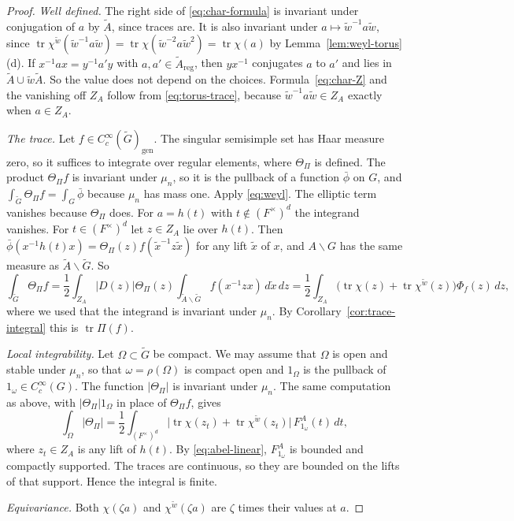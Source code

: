 \documentclass[12pt,letterpaper]{article}
\numberwithin{equation}{section}
\theoremstyle{plain}
\theoremstyle{definition}
\theoremstyle{remark}
\newcommand{\Gt}{\widetilde G}
\newcommand{\At}{\widetilde A}
\newcommand{\wt}{\tilde w}
\newcommand{\ZA}{Z_A}
\newcommand{\gen}{\mathrm{gen}}
\newcommand{\reg}{\mathrm{reg}}
\DeclareMathOperator{\tr}{tr}
\begin{document}
\begin{proof}
\emph{Well defined.} The right side of \eqref{eq:char-formula} is
invariant under conjugation of $a$ by $\At$, since traces are. It is
also invariant under $a\mapsto\wt^{-1}a\wt$, since
$\tr\chi^{\wt}(\wt^{-1}a\wt)=\tr\chi(\wt^{-2}a\wt^2)=\tr\chi(a)$ by
Lemma~\ref{lem:weyl-torus}(d). If $x^{-1}ax=y^{-1}a'y$ with
$a,a'\in\At_\reg$, then $yx^{-1}$ conjugates $a$ to $a'$ and lies in
$\At\cup\wt\At$. So the value does not depend on the choices.
Formula~\eqref{eq:char-Z} and the vanishing off $\ZA$ follow from
\eqref{eq:torus-trace}, because $\wt^{-1}a\wt\in\ZA$ exactly when
$a\in\ZA$.

\emph{The trace.} Let $f\in C_c^\infty(\Gt)_\gen$. The singular
semisimple set has Haar measure zero, so it suffices to integrate over
regular elements, where $\Theta_\Pi$ is defined. The product
$\Theta_\Pi f$ is invariant under $\mu_n$, so it is the pullback of a
function $\bar\phi$ on $G$, and $\int_{\Gt}\Theta_\Pi f=\int_G\bar\phi$
because $\mu_n$ has mass one. Apply \eqref{eq:weyl}. The elliptic term
vanishes because $\Theta_\Pi$ does. For $a=h(t)$ with
$t\notin(F^\times)^d$ the integrand vanishes. For $t\in(F^\times)^d$
let $z\in\ZA$ lie over $h(t)$. Then
$\bar\phi(x^{-1}h(t)x)=\Theta_\Pi(z)f(\tilde x^{-1}z\tilde x)$ for
any lift $\tilde x$ of $x$, and $A\backslash G$ has the same measure
as $\At\backslash\Gt$. So
\[
\int_{\Gt}\Theta_\Pi f=\frac12\int_{\ZA}|D(z)|\Theta_\Pi(z)
\int_{\At\backslash\Gt}f(x^{-1}zx)\,d\dot x\,dz
=\frac12\int_{\ZA}\bigl(\tr\chi(z)+\tr\chi^{\wt}(z)\bigr)
\Phi_f(z)\,dz,
\]
where we used that the integrand is invariant under $\mu_n$. By
Corollary~\ref{cor:trace-integral} this is $\tr\Pi(f)$.

\emph{Local integrability.} Let $\Omega\subset\Gt$ be compact. We may
assume that $\Omega$ is open and stable under $\mu_n$, so that
$\omega=\rho(\Omega)$ is compact open and $1_\Omega$ is the pullback of
$1_\omega\in C_c^\infty(G)$. The function $|\Theta_\Pi|$ is invariant
under $\mu_n$. The same computation as above, with $|\Theta_\Pi|1_\Omega$
in place of $\Theta_\Pi f$, gives
\[
\int_\Omega|\Theta_\Pi|=\frac12\int_{(F^\times)^d}
\bigl|\tr\chi(z_t)+\tr\chi^{\wt}(z_t)\bigr|\,F^A_{1_\omega}(t)\,dt,
\]
where $z_t\in\ZA$ is any lift of $h(t)$. By \eqref{eq:abel-linear},
$F^A_{1_\omega}$ is bounded and compactly supported. The traces are
continuous, so they are bounded on the lifts of that support. Hence the
integral is finite.

\emph{Equivariance.} Both $\chi(\zeta a)$ and $\chi^{\wt}(\zeta a)$ are
$\zeta$ times their values at $a$.
\end{proof}
\end{document}
